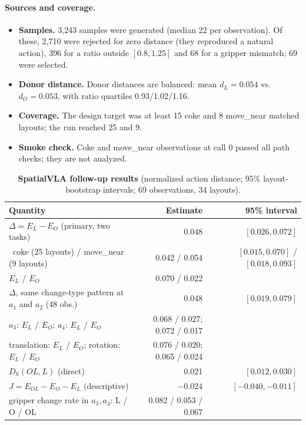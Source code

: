 \paragraph{Sources and coverage.}
\begin{itemize}
\item \textbf{Samples.} 3,243 samples were generated (median 22 per observation). Of these, 2,710 were rejected for zero distance (they reproduced a natural action), 396 for a ratio outside $[0.8,1.25]$ and 68 for a gripper mismatch; 69 were selected.
\item \textbf{Donor distance.} Donor distances are balanced: mean $d_L=0.054$ vs.\ $d_O=0.053$, with ratio quartiles 0.93/1.02/1.16.
\item \textbf{Coverage.} The design target was at least 15 coke and 8 move\_near matched layouts; the run reached 25 and 9.
\item \textbf{Smoke check.} Coke and move\_near observations at call 0 passed all path checks; they are not analyzed.
\end{itemize}

\begin{table}[h]
\centering\small
\caption{\textbf{SpatialVLA follow-up results} (normalized action distance; 95\% layout-bootstrap intervals; 69 observations, 34 layouts).}
\label{tab:svla2res}
\begin{tabular}{@{}lrr@{}}\toprule
Quantity & Estimate & 95\% interval\\\midrule
$\Delta=E_L-E_O$ (primary, two tasks) & 0.048 & $[0.026,0.072]$\\
\ coke (25 layouts) / move\_near (9 layouts) & 0.042 / 0.054 & $[0.015,0.070]$ / $[0.018,0.093]$\\
$E_L$ / $E_O$ & 0.070 / 0.022 & \\
$\Delta$, same change-type pattern at $a_1$ and $a_2$ (48 obs.) & 0.048 & $[0.019,0.079]$\\
$a_3$: $E_L$ / $E_O$; $a_4$: $E_L$ / $E_O$ & 0.068 / 0.027; 0.072 / 0.017 & \\
translation: $E_L$ / $E_O$; rotation: $E_L$ / $E_O$ & 0.076 / 0.020; 0.065 / 0.024 & \\
$D_{\mathrm S}(OL,L)$ (direct) & 0.021 & $[0.012,0.030]$\\
$J=E_{OL}-E_O-E_L$ (descriptive) & $-0.024$ & $[-0.040,-0.011]$\\
gripper change rate in $a_3,a_4$: L / O / OL & 0.082 / 0.053 / 0.067 & \\\bottomrule
\end{tabular}
\end{table}


